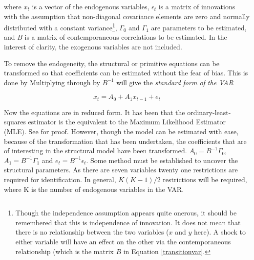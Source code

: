 \documentclass[12pt, a4paper, oneside]{article}\usepackage[]{graphicx}\usepackage[]{color}
\begin{document}
where $x_t$ is a vector of the endogenous variables, $\epsilon_t$ is a matrix of innovations with the assumption that non-diagonal covariance elements are zero and normally distributed with a constant variance\footnote{Though the independence assumption appears quite onerous, it should be remembered that this is independence of innovation.  It does not mean that there is no relationship between the two variables ($x$ and $y$ here). A shock to either variable will have an effect on the other via the contemporaneous relationship (which is the matrix $B$ in Equation \ref{transitionvar}.}, $\Gamma_0$ and $\Gamma_1$ are parameters to be estimated, and $B$ is a matrix of contemporaneous correlations to be estimated. In the interest of clarity, the exogenous variables are not included.  

To remove the endogeneity, the structural or primitive equations can be transformed so that coefficients can be estimated without the fear of bias. This is done by Multiplying through by $B^{-1}$ will give the \emph{standard form of the VAR}

\begin{equation}\label{standardvar}
x_t=A_0+A_1x_{t-1}+e_t
\end{equation}

Now the equations are in reduced form.  It has been that the ordinary-least-squares estimator is the equivalent to the Maximum Likelihood Estimator (MLE). See \citet[p. 293]{Hamilton} for proof.  However, though the model can be estimated with ease, because of the transformation that has been undertaken, the coefficients that are of interesting in the structural model have been transformed. $A_0=B^{-1}\Gamma_0$, $A_1=B^{-1}\Gamma_1$ and $e_t=B^{-1}\epsilon_t$. Some method must be established to uncover the structural parameters.  As there are seven variables twenty one restrictions are required for identification.  In general, $K(K-1)/2$ restrictions will be required, where K is the number of endogenous  variables in the VAR.
\end{document}
